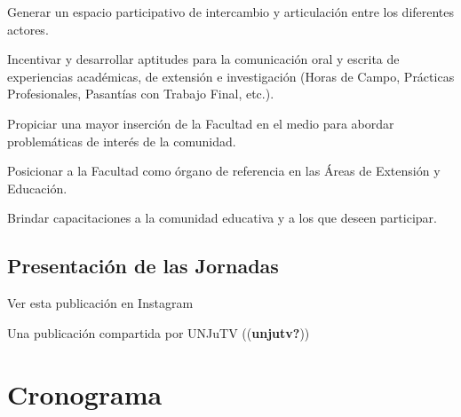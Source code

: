\documentclass[
  spanish,
  letterpaper,
  DIV=11,
  numbers=noendperiod]{scrreprt}
\begin{document}
Generar un espacio participativo de intercambio y articulación entre los
diferentes actores.

Incentivar y desarrollar aptitudes para la comunicación oral y escrita
de experiencias académicas, de extensión e investigación (Horas de
Campo, Prácticas Profesionales, Pasantías con Trabajo Final, etc.).

Propiciar una mayor inserción de la Facultad en el medio para abordar
problemáticas de interés de la comunidad.

Posicionar a la Facultad como órgano de referencia en las Áreas de
Extensión y Educación.

Brindar capacitaciones a la comunidad educativa y a los que deseen
participar.

\section{Presentación de las
Jornadas}\label{presentaciuxf3n-de-las-jornadas}

Ver esta publicación en Instagram

Una publicación compartida por UNJuTV ((\textbf{unjutv?}))


\chapter{Cronograma}\label{cronograma}
\end{document}
